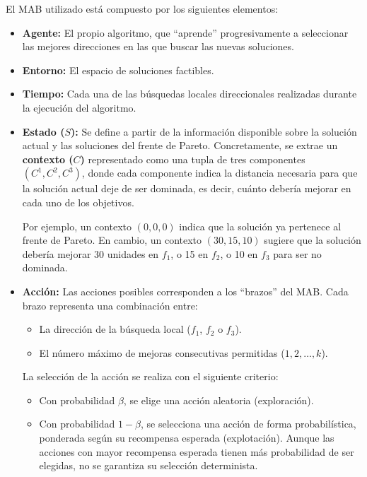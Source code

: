 \documentclass[12pt,a4paper]{book}
\begin{document}
El MAB utilizado está compuesto por los siguientes elementos:

\begin{itemize}
    \item \textbf{Agente:} El propio algoritmo, que ``aprende'' progresivamente a seleccionar las mejores direcciones en las que buscar las nuevas soluciones.
    
    \item \textbf{Entorno:} El espacio de soluciones factibles.
    
    \item \textbf{Tiempo:} Cada una de las búsquedas locales direccionales realizadas durante la ejecución del algoritmo.
    
    \item \textbf{Estado ($S$):} Se define a partir de la información disponible sobre la solución actual y las soluciones del frente de Pareto. Concretamente, se extrae un \textbf{contexto ($C$)} representado como una tupla de tres componentes $(C^1, C^2, C^3)$, donde cada componente indica la distancia necesaria para que la solución actual deje de ser dominada, es decir, cuánto debería mejorar en cada uno de los objetivos.
    
    Por ejemplo, un contexto $(0, 0, 0)$ indica que la solución ya pertenece al frente de Pareto. En cambio, un contexto $(30, 15, 10)$ sugiere que la solución debería mejorar 30 unidades en $f_1$, o 15 en $f_2$, o 10 en $f_3$ para ser no dominada.

    \item \textbf{Acción:} Las acciones posibles corresponden a los ``brazos'' del MAB. Cada brazo representa una combinación entre:
    \begin{itemize}
        \item La dirección de la búsqueda local ($f_1$, $f_2$ o $f_3$).
        \item El número máximo de mejoras consecutivas permitidas ($1, 2, \dots, k$).
    \end{itemize}

    La selección de la acción se realiza con el siguiente criterio:
    \begin{itemize}
        \item Con probabilidad $\beta$, se elige una acción aleatoria (exploración).
        \item Con probabilidad $1 - \beta$, se selecciona una acción de forma probabilística, ponderada según su recompensa esperada (explotación). Aunque las acciones con mayor recompensa esperada tienen más probabilidad de ser elegidas, no se garantiza su selección determinista.
    \end{itemize}


\end{itemize}
\end{document}
